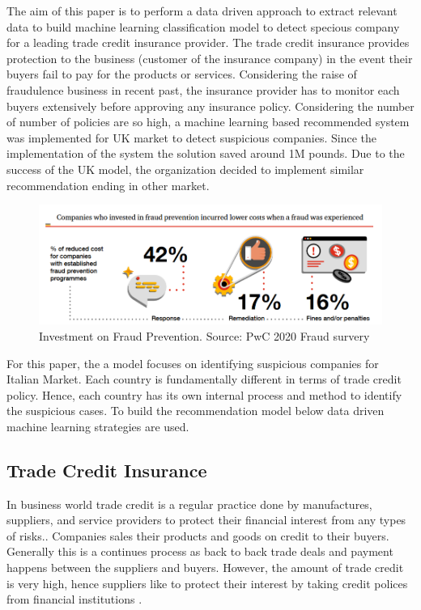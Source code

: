 

The aim of this paper is to perform a data driven approach to extract relevant data to build machine learning classification model to detect specious company for a leading trade credit insurance provider. The trade credit insurance provides protection to the business (customer of the insurance company) in the event their buyers fail to pay for the products or services. Considering the raise of fraudulence business in recent past, the insurance provider has to monitor each buyers extensively before approving any insurance policy. Considering the number of number of policies are so high, a machine learning based recommended system was implemented for UK market to detect suspicious companies. Since the implementation of the system the solution saved around 1M pounds. Due to the success of the UK model, the organization decided to implement similar recommendation ending in other market.

\begin{figure}[htp]
    \centering
    \includegraphics[width=\linewidth]{figures/prevent_fraud.PNG}
    \caption{Investment on Fraud Prevention. Source: PwC 2020 Fraud survery~\cite{PwC.Crime.Survey} }
    \label{fig:fraud_sector}
\end{figure}

For this paper, the a model focuses on identifying suspicious companies for Italian Market. Each country is fundamentally different in terms of trade credit policy. Hence, each country has its own internal process and method to identify the suspicious cases. To build the recommendation model below data driven machine learning strategies are used.


\subsection{Trade Credit Insurance}\label{subsec:trade-credit-insurance}
In business world trade credit is a regular practice done by manufactures, suppliers, and service providers to protect their financial interest from any types of risks.. Companies sales their products and goods on credit to their buyers. Generally this is a continues process as back to back trade deals and payment happens between the suppliers and buyers. However, the amount of trade credit is very high, hence suppliers like to protect their interest by taking credit polices from financial institutions  .

